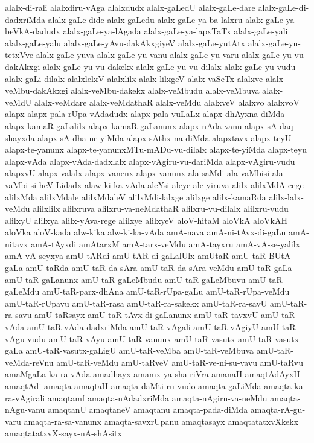 {alalx-di-rali
alalxdiru-vAga
alalxdudx
alalx-gaLedU
alalx-gaLe-dare
alalx-gaLe-di-dadxriMda
alalx-gaLe-dide
alalx-gaLedu
alalx-gaLe-ya-ba-lalxru
alalx-gaLe-ya-beVkA-dadudx
alalx-gaLe-ya-lAgada
alalx-gaLe-ya-lapxTaTx
alalx-gaLe-yali
alalx-gaLe-yalu
alalx-gaLe-yAvu-dakAkxgiyeV
alalx-gaLe-yutAtx
alalx-gaLe-yu-tetxVve
alalx-gaLe-yuva
alalx-gaLe-yu-vanu
alalx-gaLe-yu-varu
alalx-gaLe-yu-vu-dakAkxgi
alalx-gaLe-yu-vu-dakekx
alalx-gaLe-yu-vu-dilalx
alalx-gaLe-yu-vudu
alalx-gaLi-dilalx
alalxlelxV
alalxlilx
alalx-lilxgeV
alalx-vaSeTx
alalxve
alalx-veMbu-dakAkxgi
alalx-veMbu-dakekx
alalx-veMbudu
alalx-veMbuva
alalx-veMdU
alalx-veMdare
alalx-veMdathaR
alalx-veMdu
alalxveV
alalxvo
alalxvoV
alapx
alapx-pala-rUpa-vAdadudx
alapx-pala-vuLaLx
alapx-dhAyxna-diMda
alapx-kamaR-gaLalilx
alapx-kamaR-gaLanunx
alapx-nAda-vanu
alapx-sA-daq-shayxda
alapx-sA-dha-ne-yiMda
alapx-sAthx-na-diMda
alapxtavx
alapx-teyU
alapx-te-yanunx
alapx-te-yanunxMTu-mADu-vu-dilalx
alapx-te-yiMda
alapx-teyu
alapx-vAda
alapx-vAda-dadxlalx
alapx-vAgiru-vu-dariMda
alapx-vAgiru-vudu
alapxvU
alapx-valalx
alapx-vanenx
alapx-vanunx
ala-saMdi
ala-vaMbisi
ala-vaMbi-si-heV-Lidadx
alaw-ki-ka-vAda
aleYsi
aleye
ale-yiruva
alilx
alilxMdA-cege
alilxMda
alilxMdale
alilxMdaleV
alilxMdi-lalxge
alilxge
alilx-kamaRda
alilx-lalx-veMdu
alilxlilx
alilxruva
alilxru-va-neMdathaR
alilxru-vu-dilalx
alilxru-vudu
alilxyU
alilxya
alilx-yAva-rege
alilxye
alilxyeV
aloV-hitaM
aloVkA
aloVkAH
aloVka
aloV-kada
alw-kika
alw-ki-ka-vAda
amA-nava
amA-ni-tAvx-di-gaLu
amA-nitavx
amA-tAyxdi
amAtarxM
amA-tarx-veMdu
amA-tayxru
amA-vA-se-yalilx
amA-vA-seyxya
amU-tARdi
amU-tAR-di-gaLalUlx
amUtaR
amU-taR-BUtA-gaLa
amU-taRda
amU-taR-da-sAra
amU-taR-da-sAra-veMdu
amU-taR-gaLa
amU-taR-gaLanunx
amU-taR-gaLeMbudu
amU-taR-gaLeMbuvu
amU-taR-gaLeMdu
amU-taR-parx-dhAna
amU-taR-rUpa-gaLu
amU-taR-rUpa-veMdu
amU-taR-rUpavu
amU-taR-rasa
amU-taR-ra-sakekx
amU-taR-ra-savU
amU-taR-ra-savu
amU-taRsayx
amU-taR-tAvx-di-gaLanunx
amU-taR-tavxvU
amU-taR-vAda
amU-taR-vAda-dadxriMda
amU-taR-vAgali
amU-taR-vAgiyU
amU-taR-vAgu-vudu
amU-taR-vAyu
amU-taR-vanunx
amU-taR-vasutx
amU-taR-vasutx-gaLa
amU-taR-vasutx-gaLigU
amU-taR-veMba
amU-taR-veMbuva
amU-taR-veMda-reVnu
amU-taR-veMdu
amU-taRveV
amU-taR-ve-ni-su-vavu
amU-taRvu
amaMgaLa-ka-ra-vAda
amadhayx
amamx-ya-sha-riVra
amanaH
amaqtAdAyxH
amaqtAdi
amaqta
amaqtaH
amaqta-daMti-ru-vudo
amaqta-gaLiMda
amaqta-ka-ra-vAgirali
amaqtamf
amaqta-nAdadxriMda
amaqta-nAgiru-va-neMdu
amaqta-nAgu-vanu
amaqtanU
amaqtaneV
amaqtanu
amaqta-pada-diMda
amaqta-rA-gu-varu
amaqta-ra-sa-vanunx
amaqta-savxrUpanu
amaqtasayx
amaqtatatxvXkekx
amaqtatatxvX-sayx-nA-shAsitx
}
